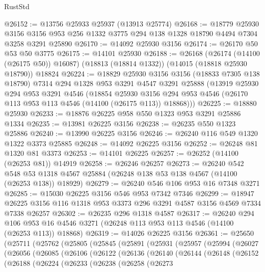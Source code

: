 \begin{lexlean}{RustStd}
\begin{coremodule}
@26152 := @13756 @25933 @25937 (@13913 @25774)
@26168 := @18779
    @25930
    @3156
    @3156
    @953
    @256
    @1332
    @3775
    @294
    @138
    @1328
    @18790
    @4494
    @7304
    @3258
    @3291
    @25890
@26170 := @14092 @25930 @3156
@26174 := @26170 @50 @53 @50 @3775
@26175 := @14101 @25930
@26188 := @26168
    (@26174 (@14100 (@26175 @50)) @16087)
    (@18813 (@18814 @1332))
    (@14015 (@18818 @25930 @18790))
    @18824
@26224 := @18829
    @25930
    @3156
    @3156
    (@18833 @7305 @138 @18790)
    @7314
    @294
    @1328
    @953
    @3291
    @4547
    @3291
    @25888
    (@13919
      @25930
      @294
      @953
      @3291
      @4546
      (@18854
        @25930
        @3156
        @294
        @953
        @4546
        (@26170 @113 @953 @113 @4546 (@14100 (@26175 @113)) @18868)))
@26225 := @18880 @25930
@26233 := @18876 @26225 @958 @550 @1323 @953 @3291 @25886 @1334
@26235 := @13981 @26225 @3156
@26238 := @26235 @550 @1323 @25886
@26240 := @13990 @26225 @3156
@26246 := @26240 @116 @549 @1320 @1322 @3373 @25885
@26248 := @14092 @26225 @3156
@26252 := @26248 @81 @1320 @81 @3373
@26253 := @14101 @26225
@26257 := @26252 (@14100 (@26253 @81)) @14919
@26258 := @26246 @26257
@26273 := @26240
    @542
    @548
    @53
    @1318
    @4567
    @25884
    (@26248 @138 @53 @138 @4567 (@14100 (@26253 @138)) @18929)
@26279 := @26240 @546 @106 @953 @16 @7348 @3271
@26285 := @15030 @26225 @3156 @546 @953 @7342 @7346
@26299 := @18947 @26225 @3156 @116 @1318 @953 @3373 @296 @3291 @4587 @3156 @4569 @7334 @7338 @26257
@26302 := @26235 @296 @1318 @4587
@26317 := @26240
    @294
    @106
    @953
    @16
    @4546
    @3271
    (@26248 @113 @953 @113 @4546 (@14100 (@26253 @113)) @18868)
@26319 := @14026 @26225 @3156
@26361 := @25650
    (@25711
      (@25762
        (@25805
          (@25845
            (@25891
              (@25931
                (@25957
                  (@25994
                    (@26027
                      (@26056
                        (@26085
                          (@26106
                            (@26122
                              (@26136
                                (@26140
                                  (@26144
                                    (@26148
                                      (@26152
                                        (@26188
                                          (@26224
                                            (@26233
                                              (@26238
                                                (@26258
                                                  (@26273

\end{coremodule}
\end{lexlean}
